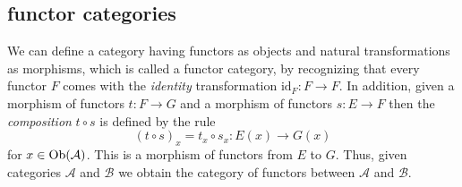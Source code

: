 
\subsection{functor categories}
\begin{frame}
We can define a category having functors as objects and natural transformations as morphisms, which is called a functor category, by recognizing that every functor $F$ comes with the {\it identity} transformation $\text{id}_F : F \to F$. In addition, given a morphism of
functors $t : F \to G$ and a morphism of functors $s : E \to F$
then the {\it composition} $t \circ s$ is defined by the rule
$$
(t \circ s)_x = t_x \circ s_x : E(x) \to G(x)
$$
for $x \in \mathop{\rm Ob}\nolimits(\mathcal{A})$.
This is a morphism of functors
from $E$ to $G$.
Thus, given categories
$\mathcal{A}$ and $\mathcal{B}$ we obtain the category of functors between $\mathcal{A}$ and
$\mathcal{B}$.
\end{frame}


